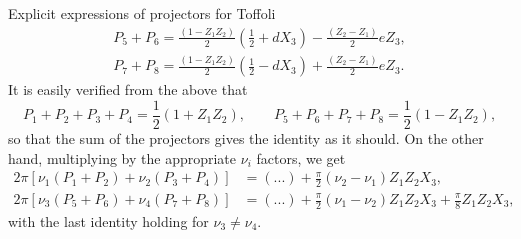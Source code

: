 \begin{tbox}[label=tcolorbox:toffoli]{Explicit expressions of projectors for Toffoli}
\begin{equation*}
	\end{equation*}
    \begin{align*}
        P_5 + P_6 = 
            \frac{(1 - Z_1 Z_2)}{2} \left(
                \frac12 + d X_3
            \right)
            - \frac{(Z_2 - Z_1)}{2} e Z_3, \\
        P_7 + P_8 = 
            \frac{(1 - Z_1 Z_2)}{2} \left(
                \frac12 - d X_3
            \right)
            + \frac{(Z_2 - Z_1)}{2} e Z_3.
    \end{align*}
	It is easily verified from the above that
	\begin{equation*}
		P_1 + P_2 + P_3 + P_4 = \frac{1}{2} (1 + Z_1 Z_2),
		\qquad
		P_5 + P_6 + P_7 + P_8 = \frac{1}{2} (1 - Z_1 Z_2),
	\end{equation*}
	so that the sum of the projectors gives the identity as it should.
	On the other hand, multiplying by the appropriate $\nu_i$ factors, we get
	\begin{equation*}
	\begin{aligned}
		2\pi\left[\nu_1(P_1 + P_2) + \nu_2(P_3 + P_4)\right]
		&= (...) + \frac{\pi}{2} (\nu_2 - \nu_1) Z_1 Z_2 X_3, \\
		2\pi\left[\nu_3(P_5 + P_6) + \nu_4(P_7 + P_8)\right]
		&= (...) + \frac{\pi}{2} (\nu_1 - \nu_2) Z_1 Z_2 X_3 + \frac{\pi}{8} Z_1 Z_2 X_3,
	\end{aligned}
	\end{equation*}
	with the last identity holding for $\nu_3\neq \nu_4$.
\end{tbox}

